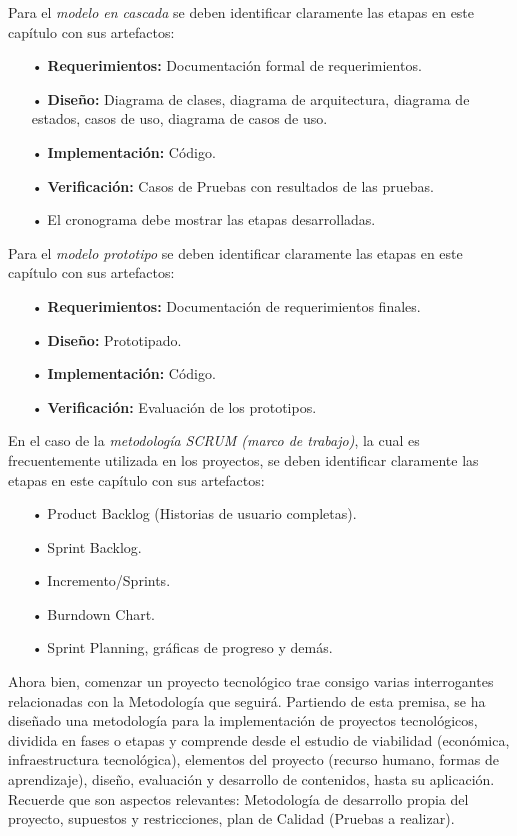 \documentclass[12pt, a4paper, nofontenc, numbers=endperiod]{apa7}
\begin{document}
{\setlength{\parindent}{1.27cm}Para el \textit{modelo en cascada} se deben identificar claramente las etapas en este capítulo con sus artefactos:
{\doublespacing
\begin{itemize}[leftmargin=1.70cm]
	\item[•] \textbf{Requerimientos: }Documentación formal de requerimientos.
	\item[•]  \textbf{Diseño: }Diagrama de clases, diagrama de arquitectura, diagrama de estados, casos de uso, diagrama de casos de uso.
	\item[•] \textbf{Implementación: } Código. 
	\item[•] \textbf{Verificación: } Casos de Pruebas con resultados de las pruebas.
	\item[•] El cronograma debe mostrar las etapas desarrolladas.
\end{itemize}	
}
\setlength{\parindent}{1.27cm}Para el \textit{modelo prototipo} se deben identificar claramente las etapas en este capítulo con sus artefactos:
{\doublespacing
\begin{itemize}[leftmargin=1.70cm]
	\item[•] \textbf{Requerimientos: }Documentación de requerimientos finales. 
	\item[•] \textbf{Diseño: }Prototipado.
	\item[•] \textbf{Implementación: } Código. 
	\item[•] \textbf{Verificación: } Evaluación de los prototipos.
\end{itemize}
}	
\setlength{\parindent}{1.27cm}En el caso de la \textit{metodología SCRUM (marco de trabajo)}, la cual es frecuentemente utilizada en los proyectos, se deben identificar claramente las etapas en este capítulo con sus artefactos: 
{\doublespacing
\begin{itemize}[leftmargin=1.70cm]
	\item[•] Product Backlog (Historias de usuario completas).
	\item[•] Sprint Backlog.
	\item[•]Incremento/Sprints.
	\item[•] Burndown Chart.
	\item[•] Sprint Planning, gráficas de progreso y demás.
\end{itemize}		
}
\setlength{\parindent}{1.27cm}Ahora bien, comenzar un proyecto tecnológico trae consigo varias interrogantes relacionadas con la Metodología que seguirá. Partiendo de esta premisa, se ha diseñado una metodología para la implementación de proyectos tecnológicos, dividida en fases o etapas y comprende desde el estudio de viabilidad (económica, infraestructura tecnológica), elementos del proyecto (recurso humano, formas de aprendizaje), diseño, evaluación y desarrollo de contenidos, hasta su aplicación.  Recuerde que son aspectos relevantes: Metodología de desarrollo propia del proyecto, supuestos y restricciones, plan de Calidad (Pruebas a realizar).

}
\end{document}
